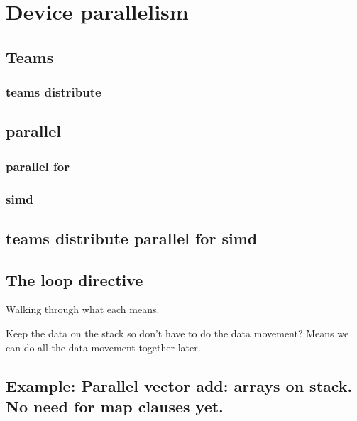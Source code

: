 
\chapter{Device parallelism}
\section{Teams}
\subsection{teams distribute}

\section{parallel}
\subsection{parallel for}
\subsection{simd}

\section{teams distribute parallel for simd}

\section{The loop directive}

Walking through what each means.

Keep the data on the stack so don’t have to do the data movement? Means we can do all the data movement together later.
\section{Example: Parallel vector add: arrays on stack. No need for map clauses yet.}

